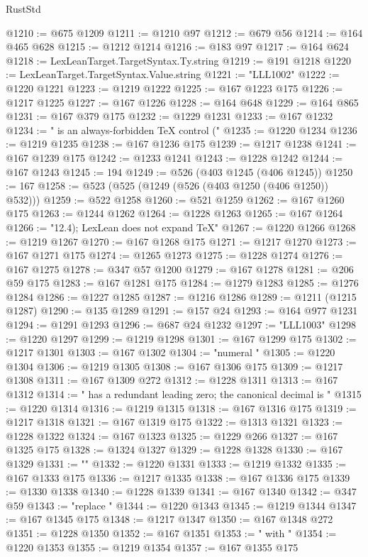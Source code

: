 \begin{lexlean}{RustStd}
\begin{coremodule}
@1210 := @675 @1209
@1211 := @1210 @97
@1212 := @679 @56
@1214 := @164 @465 @628
@1215 := @1212 @1214
@1216 := @183 @97
@1217 := @164 @624
@1218 := LexLeanTarget.TargetSyntax.Ty.string
@1219 := @191 @1218
@1220 := LexLeanTarget.TargetSyntax.Value.string
@1221 := "LLL1002"
@1222 := @1220 @1221
@1223 := @1219 @1222
@1225 := @167 @1223 @175
@1226 := @1217 @1225
@1227 := @167 @1226
@1228 := @164 @648
@1229 := @164 @865
@1231 := @167 @379 @175
@1232 := @1229 @1231
@1233 := @167 @1232
@1234 := " is an always-forbidden TeX control ("
@1235 := @1220 @1234
@1236 := @1219 @1235
@1238 := @167 @1236 @175
@1239 := @1217 @1238
@1241 := @167 @1239 @175
@1242 := @1233 @1241
@1243 := @1228 @1242
@1244 := @167 @1243
@1245 := 194
@1249 := @526 (@403 @1245 (@406 @1245))
@1250 := 167
@1258 := @523 (@525 (@1249 (@526 (@403 @1250 (@406 @1250)) @532)))
@1259 := @522 @1258
@1260 := @521 @1259
@1262 := @167 @1260 @175
@1263 := @1244 @1262
@1264 := @1228 @1263
@1265 := @167 @1264
@1266 := "12.4); LexLean does not expand TeX"
@1267 := @1220 @1266
@1268 := @1219 @1267
@1270 := @167 @1268 @175
@1271 := @1217 @1270
@1273 := @167 @1271 @175
@1274 := @1265 @1273
@1275 := @1228 @1274
@1276 := @167 @1275
@1278 := @347 @57 @1200
@1279 := @167 @1278
@1281 := @206 @59 @175
@1283 := @167 @1281 @175
@1284 := @1279 @1283
@1285 := @1276 @1284
@1286 := @1227 @1285
@1287 := @1216 @1286
@1289 := @1211 (@1215 @1287)
@1290 := @135 @1289
@1291 := @157 @24
@1293 := @164 @977 @1231
@1294 := @1291 @1293
@1296 := @687 @24 @1232
@1297 := "LLL1003"
@1298 := @1220 @1297
@1299 := @1219 @1298
@1301 := @167 @1299 @175
@1302 := @1217 @1301
@1303 := @167 @1302
@1304 := "numeral "
@1305 := @1220 @1304
@1306 := @1219 @1305
@1308 := @167 @1306 @175
@1309 := @1217 @1308
@1311 := @167 @1309 @272
@1312 := @1228 @1311
@1313 := @167 @1312
@1314 := " has a redundant leading zero; the canonical decimal is "
@1315 := @1220 @1314
@1316 := @1219 @1315
@1318 := @167 @1316 @175
@1319 := @1217 @1318
@1321 := @167 @1319 @175
@1322 := @1313 @1321
@1323 := @1228 @1322
@1324 := @167 @1323
@1325 := @1229 @266
@1327 := @167 @1325 @175
@1328 := @1324 @1327
@1329 := @1228 @1328
@1330 := @167 @1329
@1331 := ""
@1332 := @1220 @1331
@1333 := @1219 @1332
@1335 := @167 @1333 @175
@1336 := @1217 @1335
@1338 := @167 @1336 @175
@1339 := @1330 @1338
@1340 := @1228 @1339
@1341 := @167 @1340
@1342 := @347 @59
@1343 := "replace "
@1344 := @1220 @1343
@1345 := @1219 @1344
@1347 := @167 @1345 @175
@1348 := @1217 @1347
@1350 := @167 @1348 @272
@1351 := @1228 @1350
@1352 := @167 @1351
@1353 := " with "
@1354 := @1220 @1353
@1355 := @1219 @1354
@1357 := @167 @1355 @175

\end{coremodule}
\end{lexlean}
